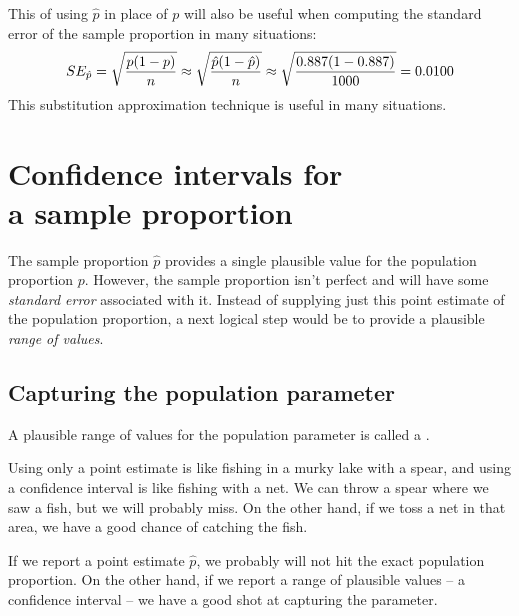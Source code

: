 This  of using $\hat{p}$ in
place of $p$ will also be useful when computing the standard error
of the sample proportion in many situations:
\begin{align*}
SE_{\hat{p}}
    = \sqrt{\frac{p (1 - p)}{n}}
    \approx \sqrt{\frac{\hat{p} (1 - \hat{p})}{n}}
    \approx \sqrt{\frac{0.887{}
        (1 - 0.887{})}{1000{}}}
    = 0.0100{}
\end{align*}
This substitution approximation technique is useful in many
situations.




\section[Confidence interval for a sample proportion]{Confidence
    intervals for\\a sample proportion} %
\label{confidenceIntervals}


The sample proportion $\hat{p}$ provides a single plausible value
for the population proportion $p$. However, the sample proportion
isn't perfect and will have some \emph{standard error}
associated with it. Instead of supplying just this point estimate
of the population proportion, a next logical step would be
to provide a plausible \emph{range of values}.

\subsection{Capturing the population parameter}

A plausible range of values for the population parameter
is called a .

Using only a point estimate is like fishing in a murky
lake with a spear, and using a confidence interval is
like fishing with a net. We can throw a spear where we
saw a fish, but we will probably miss. On the other hand,
if we toss a net in that area, we have a good chance of
catching the fish.

If we report a point estimate $\hat{p}$, we probably
will not hit the exact population proportion. On the
other hand, if we report a range of plausible values
-- a confidence interval -- we have a good shot at
capturing the parameter. 

